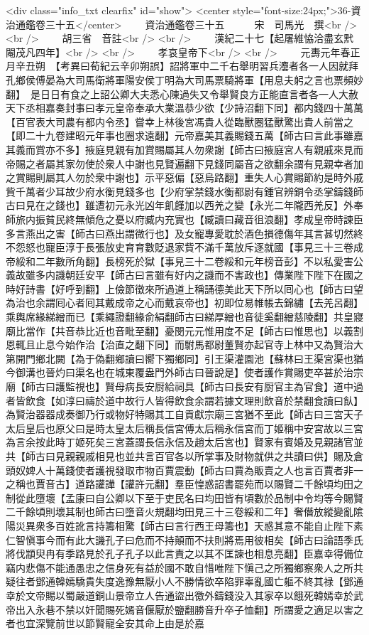 <div class="info_txt clearfix" id="show">
<center style="font-size:24px;">36-資治通鑑卷三十五</center>
  　　資治通鑑卷三十五　　　宋　司馬光　撰<br />
<br />
　　胡三省　音註<br />
<br />
　　漢紀二十七【起屠維恊洽盡玄黓閹茂凡四年】<br />
<br />
　　孝哀皇帝下<br />
<br />
　　元夀元年春正月辛丑朔　【考異曰荀紀云辛卯朔誤】詔將軍中二千右舉明習兵灋者各一人因就拜孔鄉侯傅晏為大司馬衛將軍陽安侯丁明為大司馬票騎將軍【用息夫躬之言也票頻妙翻】　是日日有食之上詔公卿大夫悉心陳過失又令舉賢良方正能直言者各一人大赦天下丞相嘉奏封事曰孝元皇帝奉承大業溫恭少欲【少詩沼翻下同】都内錢四十萬萬【百官表大司農有都内令丞】嘗幸上林後宮馮貴人從臨獸圈猛獸驚出貴人前當之【即二十九卷建昭元年事也圈求遠翻】元帝嘉美其義賜錢五萬【師古曰言此事雖嘉其義而賞亦不多】掖庭見親有加賞賜屬其人勿衆謝【師古曰掖庭宮人有親戚來見而帝賜之者屬其家勿使於衆人中謝也見賢遍翻下見錢同屬音之欲翻余謂有見親幸者加之賞賜則屬其人勿於衆中謝也】示平惡偏【惡烏路翻】重失人心賞賜節約是時外戚貲千萬者少耳故少府水衡見錢多也【少府掌禁錢水衡都尉有鍾官辨銅令丞掌鑄錢師古曰見在之錢也】雖遭初元永光凶年飢饉加以西羌之變【永光二年隴西羌反】外奉師旅内振貧民終無傾危之憂以府臧内充實也【臧讀曰藏音徂浪翻】孝成皇帝時諫臣多言燕出之害【師古曰燕出謂微行也】及女寵專愛耽於酒色損德傷年其言甚切然終不怨怒也寵臣淳于長張放史育育數貶退家貲不滿千萬放斥逐就國【事見三十三卷成帝綏和二年數所角翻】長榜死於獄【事見三十二卷綏和元年榜音彭】不以私愛害公義故雖多内譏朝廷安平【師古曰言雖有好内之譏而不害政也】傳業陛下陛下在國之時好詩書【好呼到翻】上儉節徵來所過道上稱誦德美此天下所以囘心也【師古曰望為治也余謂囘心者囘其戴成帝之心而戴哀帝也】初即位易帷帳去錦繡【去羌呂翻】乘輿席緣綈繒而已【乘繩證翻緣俞絹翻師古曰綈厚繒也音徒奚翻繒慈陵翻】共皇寢廟比當作【共音恭比近也音毗至翻】憂閔元元惟用度不足【師古曰惟思也】以義割恩輒且止息今始作治【治直之翻下同】而駙馬都尉董賢亦起官寺上林中又為賢治大第開門鄉北闕【為于偽翻鄉讀曰嚮下獨鄉同】引王渠灌園池【蘇林曰王渠宮渠也猶今御溝也晉灼曰渠名也在城東覆盎門外師古曰晉說是】使者護作賞賜吏卒甚於治宗廟【師古曰護監視也】賢母病長安厨給祠具【師古曰長安有厨官主為官食】道中過者皆飲食【如淳曰禱於道中故行人皆得飲食余謂若據文理則飲音於禁翻食讀曰飤】為賢治器器成奏御乃行或物好特賜其工自貢獻宗廟三宮猶不至此【師古曰三宮天子太后皇后也原父曰是時太皇太后稱長信宮傅太后稱永信宮而丁姬稱中安宮故以三宮為言余按此時丁姬死矣三宮蓋謂長信永信及趙太后宮也】賢家有賓婚及見親諸官並共【師古曰見親親戚相見也並共言百官各以所掌事及財物就供之共讀曰供】賜及倉頭奴婢人十萬錢使者護視發取市物百賈震動【師古曰賈為販賣之人也言百賈者非一之稱也賈音古】道路讙譁【讙許元翻】羣臣惶惑詔書罷苑而以賜賢二千餘頃均田之制從此墮壞【孟康曰自公卿以下至于吏民名曰均田皆有頃數於品制中令均等今賜賢二千餘頃則壞其制也師古曰墮音火規翻均田見三十三卷綏和二年】奢僭放縱變亂隂陽災異衆多百姓訛言持籌相驚【師古曰言行西王母籌也】天惑其意不能自止陛下素仁智愼事今而有此大譏孔子曰危而不持顛而不扶則將焉用彼相矣【師古曰論語季氏將伐顓臾冉有季路見於孔子孔子以此言責之以其不匡諫也相息亮翻】臣嘉幸得備位竊内悲傷不能通愚忠之信身死有益於國不敢自惜唯陛下愼己之所獨鄉察衆人之所共疑往者鄧通韓嫣驕貴失度逸豫無厭小人不勝情欲卒陷罪辜亂國亡軀不終其禄【鄧通幸於文帝賜以蜀嚴道銅山景帝立人告通盜出徼外鑄錢没入其家卒以餓死韓嫣幸於武帝出入永巷不禁以奸聞賜死嫣音偃厭於鹽翻勝音升卒子恤翻】所謂愛之適足以害之者也宜深覽前世以節賢寵全安其命上由是於嘉